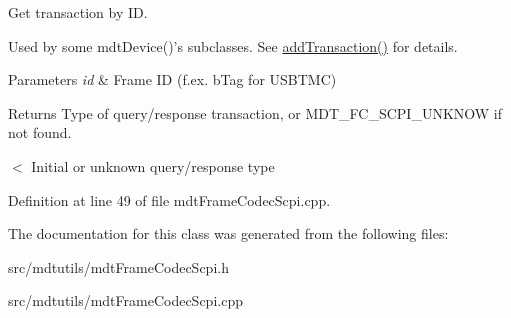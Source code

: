 Get transaction by ID. 

Used by some mdtDevice()'s subclasses. See \hyperlink{classmdt_frame_codec_scpi_a5287ff3f107ca10097cdb499e62f6906}{addTransaction()} for details.


\begin{DoxyParams}{Parameters}
{\em id} & Frame ID (f.ex. bTag for USBTMC) \\
\hline
\end{DoxyParams}
\begin{DoxyReturn}{Returns}
Type of query/response transaction, or MDT\_\-FC\_\-SCPI\_\-UNKNOW if not found. 
\end{DoxyReturn}


$<$ Initial or unknown query/response type 



Definition at line 49 of file mdtFrameCodecScpi.cpp.



The documentation for this class was generated from the following files:\begin{DoxyCompactItemize}
\item 
src/mdtutils/mdtFrameCodecScpi.h\item 
src/mdtutils/mdtFrameCodecScpi.cpp\end{DoxyCompactItemize}
